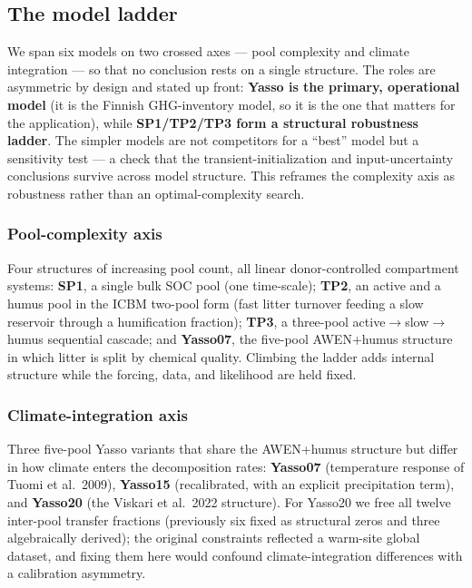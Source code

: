 \documentclass[11pt]{article}
\begin{document}
\subsection{The model ladder}
We span six models on two crossed axes --- pool complexity and climate
integration --- so that no conclusion rests on a single structure. The roles are
asymmetric by design and stated up front: \textbf{Yasso is the primary,
operational model} (it is the Finnish GHG-inventory model, so it is the one that
matters for the application), while \textbf{SP1/TP2/TP3 form a structural
robustness ladder}. The simpler models are not competitors for a ``best'' model
but a sensitivity test --- a check that the transient-initialization and
input-uncertainty conclusions survive across model structure. This reframes the
complexity axis as robustness rather than an optimal-complexity search.

\subsubsection{Pool-complexity axis}
Four structures of increasing pool count, all linear donor-controlled
compartment systems: \textbf{SP1}, a single bulk SOC pool (one time-scale);
\textbf{TP2}, an active and a humus pool in the ICBM two-pool form (fast litter
turnover feeding a slow reservoir through a humification fraction);
\textbf{TP3}, a three-pool active$\to$slow$\to$humus sequential cascade; and
\textbf{Yasso07}, the five-pool AWEN+humus structure in which litter is split by
chemical quality. Climbing the ladder adds internal structure while the
forcing, data, and likelihood are held fixed.

\subsubsection{Climate-integration axis}
Three five-pool Yasso variants that share the AWEN+humus structure but differ in
how climate enters the decomposition rates: \textbf{Yasso07} (temperature
response of Tuomi et al.\ 2009), \textbf{Yasso15} (recalibrated, with an
explicit precipitation term), and \textbf{Yasso20} (the Viskari et al.\ 2022
structure). For Yasso20 we free all twelve inter-pool transfer fractions
(previously six fixed as structural zeros and three algebraically derived); the
original constraints reflected a warm-site global dataset, and fixing them here
would confound climate-integration differences with a calibration asymmetry.
\end{document}
